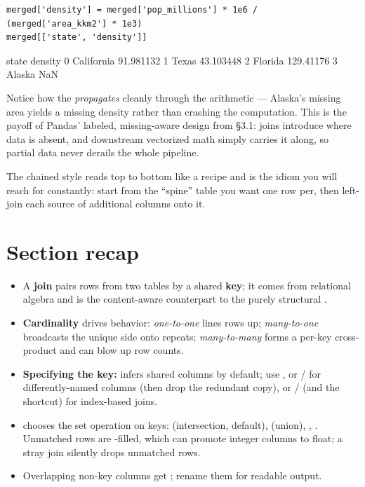 \documentclass[11pt]{article}
\begin{document}
\begin{lstlisting}
merged['density'] = merged['pop_millions'] * 1e6 / (merged['area_kkm2'] * 1e3)
merged[['state', 'density']]
\end{lstlisting}

\begin{outblock}
        state    density
0  California  91.981132
1       Texas  43.103448
2     Florida  129.41176
3      Alaska        NaN
\end{outblock}

\begin{intuition}
Notice how the  \emph{propagates} cleanly through the arithmetic --- Alaska's missing area yields a missing density rather than crashing the computation. This is the payoff of Pandas' labeled, missing-aware design from \S3.1: joins introduce  where data is absent, and downstream vectorized math simply carries it along, so partial data never derails the whole pipeline.
\end{intuition}

The chained  style reads top to bottom like a recipe and is the idiom you will reach for constantly: start from the ``spine'' table you want one row per, then left-join each source of additional columns onto it.

\section*{Section recap}
\begin{itemize}
  \item A \textbf{join} pairs rows from two tables by a shared \textbf{key}; it comes from relational algebra and is the content-aware counterpart to the purely structural .
  \item \textbf{Cardinality} drives behavior: \emph{one-to-one} lines rows up; \emph{many-to-one} broadcasts the unique side onto repeats; \emph{many-to-many} forms a per-key cross-product and can blow up row counts.
  \item \textbf{Specifying the key:}  infers shared columns by default; use , or / for differently-named columns (then drop the redundant copy), or / (and the  shortcut) for index-based joins.
  \item \textbf{} chooses the set operation on keys:  (intersection, default),  (union), , . Unmatched rows are -filled, which can promote integer columns to float; a stray  join silently drops unmatched rows.
  \item Overlapping non-key columns get ; rename them for readable output.
\end{itemize}
\end{document}
